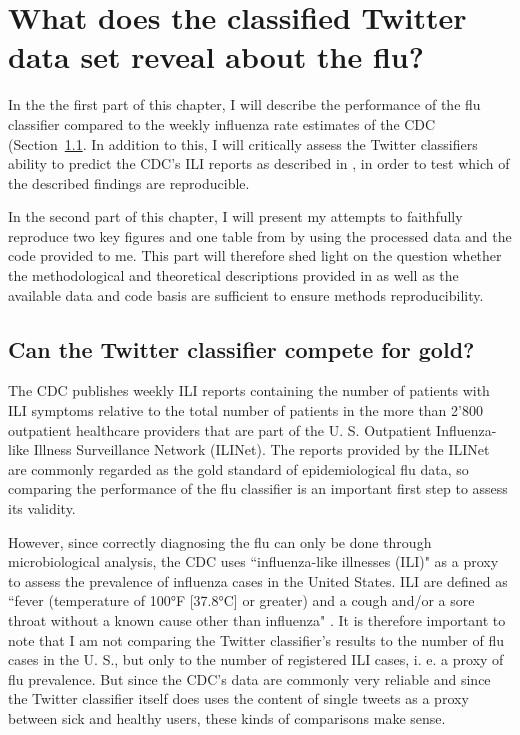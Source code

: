 \documentclass[11pt, a4paper,twoside]{report}\usepackage[]{graphicx}\usepackage[]{color}
\begin{document}
\thispagestyle{empty}
\cleardoublepage

\chapter{What does the classified Twitter data set reveal about the flu?}
\label{ch:results}

In the the first part of this chapter, I will describe the performance of the flu classifier compared to the weekly influenza rate estimates of the CDC (Section~\ref{sec:comparison_cdc}. In addition to this, I will critically assess the Twitter classifiers ability to predict the CDC's ILI reports as described in \cite{bodnar_data_2015}, in order to test which of the described findings are reproducible.

In the second part of this chapter, I will present my attempts to faithfully reproduce two key figures and one table from \cite{bodnar_data_2015} by using the processed data and the code provided to me. This part will therefore shed light on the question whether the methodological and theoretical descriptions provided in \cite{bodnar_data_2015} as well as the available data and code basis are sufficient to ensure methods reproducibility.

\section{Can the Twitter classifier compete for gold?}
\label{sec:comparison_cdc}

The CDC publishes weekly ILI reports containing the number of patients with ILI symptoms relative to the total number of patients in the more than 2'800 outpatient healthcare providers that are part of the U. S. Outpatient Influenza-like Illness Surveillance Network (ILINet). The reports provided by the ILINet are commonly regarded as the gold standard of epidemiological flu data, so comparing the performance of the flu classifier is an important first step to assess its validity. 

However, since correctly diagnosing the flu can only be done through microbiological analysis, the CDC uses ``influenza-like illnesses (ILI)" as a proxy to assess the prevalence of influenza cases in the United States. ILI are defined as ``fever (temperature of 100°F [37.8°C] or greater) and a cough and/or a sore throat without a known cause other than influenza" \citep{cdc_surveillance_2016}. It is therefore important to note that I am not comparing the Twitter classifier's results to the number of flu cases in the U. S., but only to the number of registered ILI cases, i. e. a proxy of flu prevalence. But since the CDC's data are commonly very reliable and since the Twitter classifier itself does uses the content of single tweets as a proxy between sick and healthy users, these kinds of comparisons make sense. 
\end{document}
